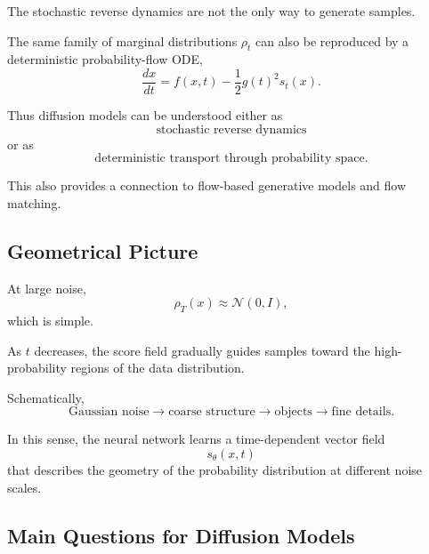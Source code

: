 The stochastic reverse dynamics are not the only way to generate samples.

The same family of marginal distributions $\rho_t$ can also be reproduced by
a deterministic probability-flow ODE,
\begin{equation}
    \frac{dx}{dt}
    =
    f(x,t)
    -
    \frac{1}{2}
    g(t)^2
    s_t(x).
\end{equation}

Thus diffusion models can be understood either as
\begin{equation}
    \text{stochastic reverse dynamics}
\end{equation}
or as
\begin{equation}
    \text{deterministic transport through probability space}.
\end{equation}

This also provides a connection to flow-based generative models and flow
matching.


\subsection{Geometrical Picture}

At large noise,
\begin{equation}
    \rho_T(x)
    \approx
    \mathcal N(0,I),
\end{equation}
which is simple.

As $t$ decreases, the score field gradually guides samples toward the
high-probability regions of the data distribution.

Schematically,
\begin{equation}
    \text{Gaussian noise}
    \rightarrow
    \text{coarse structure}
    \rightarrow
    \text{objects}
    \rightarrow
    \text{fine details}.
\end{equation}

In this sense, the neural network learns a time-dependent vector field
\begin{equation}
    s_\theta(x,t)
\end{equation}
that describes the geometry of the probability distribution at different noise
scales.



\subsection{Main Questions for Diffusion Models}


